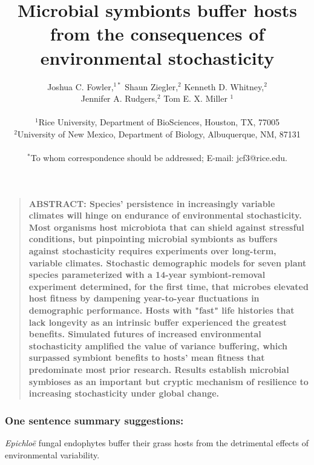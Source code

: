 \documentclass[12pt]{article}
\title{Microbial symbionts buffer hosts from the consequences of environmental stochasticity}
\author
{Joshua C. Fowler,$^{1\ast}$ Shaun Ziegler,$^{2}$ Kenneth D. Whitney,$^{2}$\\
	 Jennifer A. Rudgers,$^{2}$ Tom E. X. Miller $^{1}$\\
\\
\normalsize{$^{1}$Rice University, Department of BioSciences, Houston, TX, 77005}\\
\normalsize{$^{2}$University of New Mexico, Department of Biology, Albuquerque, NM, 87131}\\
\\
\normalsize{$^\ast$To whom correspondence should be addressed; E-mail:  jcf3@rice.edu.}
}
\date{}
\newenvironment{sciabstract}{%
\begin{quote} \bf}
{\end{quote}}
\begin{document}
 


\baselineskip24pt


\maketitle 



\begin{sciabstract}
	ABSTRACT: 
Species' persistence in increasingly variable climates will hinge on endurance of environmental stochasticity.
Most organisms host microbiota that can shield against stressful conditions, but pinpointing microbial symbionts as buffers against stochasticity requires experiments over long-term, variable climates. 
Stochastic demographic models for seven plant species parameterized with a 14-year symbiont-removal experiment determined, for the first time, that microbes elevated host fitness by dampening year-to-year fluctuations in demographic performance. 
Hosts with "fast" life histories that lack longevity as an intrinsic buffer experienced the greatest benefits. 
Simulated futures of increased environmental stochasticity amplified the value of variance buffering, which surpassed symbiont benefits to hosts' mean fitness that predominate most prior research.
Results establish microbial symbioses as an important but cryptic mechanism of resilience to increasing stochasticity under global change.

\end{sciabstract}


\subsubsection*{One sentence summary suggestions:}
\emph{Epichloë} fungal endophytes buffer their grass hosts from the detrimental effects of environmental variability.
\end{document}
